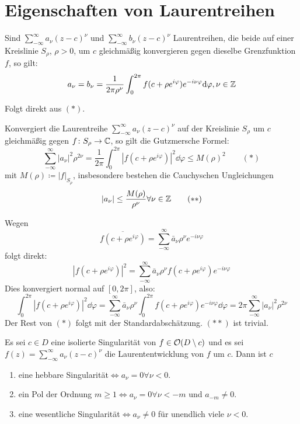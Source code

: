 \section{Eigenschaften von Laurentreihen}
\begin{satz}
	Sind $ \sum_{-\infty}^{\infty}a_\nu(z-c)^\nu $ und $ \sum_{-\infty}^{\infty}b_\nu(z-c)^\nu $ Laurentreihen, die beide auf einer Kreislinie $ S_\rho $, $ \rho>0 $, um $ c $ gleichm\"a\ss ig konvergieren gegen dieselbe Grenzfunktion $ f $, so gilt:
	\[ a_\nu=b_\nu=\frac{1}{2\pi\rho^\nu}\int_0^{2\pi}f(c+\rho e^{i\varphi})e^{-i\nu\varphi}\mathrm d\varphi, \nu\in\mathbb{Z} \] 
\end{satz}
\begin{beweis}
	Folgt direkt aus $ (\ast) $.
\end{beweis}
\begin{satz}
	Konvergiert die Laurentreihe $ \sum_{-\infty}^{\infty}a_\nu(z-c)^\nu $ auf der Kreislinie $ S_\rho $ um $ c $ gleichm\"a\ss ig gegen $ f\colon S_\rho\rightarrow\mathbb{C} $, so gilt die Gutzmersche Formel:
	\[ \sum_{-\infty}^{\infty}|a_\nu|^2\rho^{2\nu}=\frac{1}{2\pi}\int_0^{2\pi}|f(c+\rho e^{i\varphi})|^2\dd\varphi\leq M(\rho)^2\qquad (\ast) \]
	mit $ M(\rho)\coloneqq |f|_{S_\rho} $, insbesondere bestehen die Cauchyschen Ungleichungen
	\[ |a_\nu|\leq\frac{M(\rho)}{\rho^\nu}\forall\nu\in\mathbb{Z}\qquad(\ast\ast) \]
\end{satz}
\begin{beweis}
	Wegen
	\[ \overline{f(c+\rho e^{i\varphi})}=\sum_{-\infty}^{\infty}\bar a_\nu\rho^\nu e^{-i\nu\varphi} \]
	folgt direkt:
	\[ |f(c+\rho e^{i\varphi})|^2=\sum_{-\infty}^{\infty}\bar a_\nu\rho^\nu f(c+\rho e^{i\varphi})e^{-i\nu\varphi} \]
	Dies konvergiert normal auf $ [0,2\pi] $, also:
	\[ \int_0^{2\pi}|f(c+\rho e^{i\varphi})|^2\dd\varphi=\sum_{-\infty}^{\infty}\bar a_\nu\rho^\nu\int_0^{2\pi} f(c+\rho e^{i\varphi})e^{-i\nu\varphi}\dd\varphi=2\pi\sum_{-\infty}^{\infty}|a_\nu|^2\rho^{2\nu} \]
	Der Rest von $ (\ast) $ folgt mit der Standardabsch\"atzung.
	$ (\ast\ast) $ ist trivial.
\end{beweis}
\begin{satz}
	Es sei $ c\in D $ eine isolierte Singularit\"at von $ f\in\mathcal O(D\setminus c) $ und es sei $ f(z)=\sum_{-\infty}^{\infty}a_\nu(z-c)^\nu $ die Laurententwicklung von $ f $ um $ c $. Dann ist $ c $
	\begin{enumerate}
		\item eine hebbare Singularit\"at$ \Leftrightarrow a_\nu=0\forall\nu < 0 $.
		\item ein Pol der Ordnung $ m\geq 1\Leftrightarrow a_\nu=0\forall \nu<-m $ und $ a_{-m}\neq 0 $.
		\item eine wesentliche Singularit\"at$ \Leftrightarrow a_\nu\neq 0$ f\"ur unendlich viele $ \nu <0 $.
	\end{enumerate}
\end{satz}